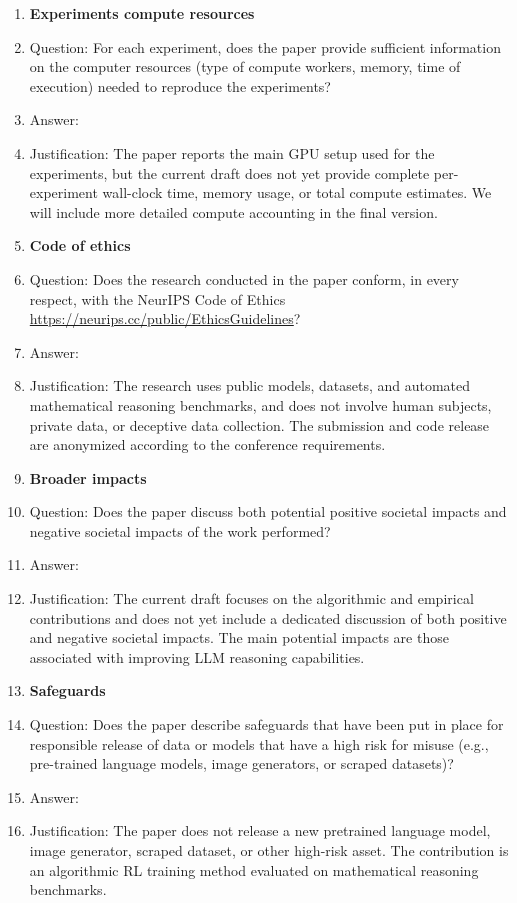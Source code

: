 \begin{enumerate}
\item {\bf Experiments compute resources}
    \item[] Question: For each experiment, does the paper provide sufficient information on the computer resources (type of compute workers, memory, time of execution) needed to reproduce the experiments?
    \item[] Answer: \answerNo{}
    \item[] Justification: The paper reports the main GPU setup used for the experiments, but the current draft does not yet provide complete per-experiment wall-clock time, memory usage, or total compute estimates. We will include more detailed compute accounting in the final version.

\item {\bf Code of ethics}
    \item[] Question: Does the research conducted in the paper conform, in every respect, with the NeurIPS Code of Ethics \url{https://neurips.cc/public/EthicsGuidelines}?
    \item[] Answer: \answerYes{}
    \item[] Justification: The research uses public models, datasets, and automated mathematical reasoning benchmarks, and does not involve human subjects, private data, or deceptive data collection. The submission and code release are anonymized according to the conference requirements.

\item {\bf Broader impacts}
    \item[] Question: Does the paper discuss both potential positive societal impacts and negative societal impacts of the work performed?
    \item[] Answer: \answerNo{}
    \item[] Justification: The current draft focuses on the algorithmic and empirical contributions and does not yet include a dedicated discussion of both positive and negative societal impacts. The main potential impacts are those associated with improving LLM reasoning capabilities.

\item {\bf Safeguards}
    \item[] Question: Does the paper describe safeguards that have been put in place for responsible release of data or models that have a high risk for misuse (e.g., pre-trained language models, image generators, or scraped datasets)?
    \item[] Answer: \answerNA{}
    \item[] Justification: The paper does not release a new pretrained language model, image generator, scraped dataset, or other high-risk asset. The contribution is an algorithmic RL training method evaluated on mathematical reasoning benchmarks.


\end{enumerate}
